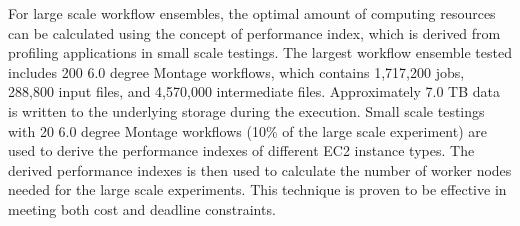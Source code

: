 For large scale workflow ensembles, the optimal amount of computing resources can be calculated using the concept of performance index, which is derived from profiling applications in small scale testings. The largest workflow ensemble tested includes 200 6.0 degree Montage workflows, which contains 1,717,200 jobs, 288,800 input files, and 4,570,000 intermediate files. Approximately 7.0 TB data is written to the underlying storage during the execution. Small scale testings with 20 6.0 degree Montage workflows (10\% of the large scale experiment) are used to derive the performance indexes of different EC2 instance types. The derived performance indexes is then used to calculate the number of worker nodes needed for the large scale experiments. This technique is proven to be effective in meeting both cost and deadline constraints. 


